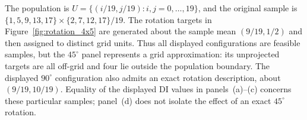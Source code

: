 
\caption{Translation and grid-approximated rotation for a regular
\(20\times20\) population with \(n=20\).
Panel~(a) shows the original \(5\times4\) sample;
panel~(b) translates it by \((1,-1)/19\).
Panels~(c) and~(d) assign targets rotated by \(90^\circ\) and
\(45^\circ\) about the original sample mean to distinct population
units by minimum-total-Euclidean-distance assignment.
All displayed samples are therefore subsets of the finite population;
panel~(d) is not an exact rigid rotation.
The displayed DI values are \(0.00,0.00,0.00,-0.14\), respectively.
MI, VI and BI are shown for comparison.}

The population is
\(U=\{(i/19,j/19):i,j=0,\ldots,19\}\), and the original sample is
\(\{1,5,9,13,17\}\times\{2,7,12,17\}/19\).
The rotation targets in Figure~\ref{fig:rotation_4x5} are generated about
the sample mean \((9/19,1/2)\) and then assigned to distinct grid units.
Thus all displayed configurations are feasible samples, but the
\(45^\circ\) panel represents a grid approximation: its unprojected
targets are all off-grid and four lie outside the population boundary.
The displayed \(90^\circ\) configuration also admits an exact rotation
description, about \((9/19,10/19)\).
Equality of the displayed DI values in panels~(a)--(c) concerns these
particular samples; panel~(d) does not isolate the effect of an exact
\(45^\circ\) rotation.
